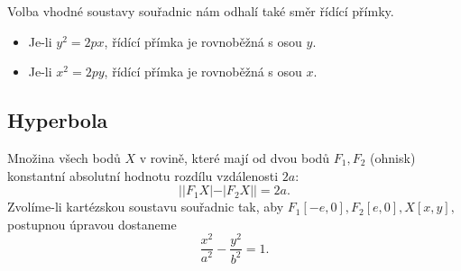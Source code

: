 \begin{pozn} Volba vhodné soustavy souřadnic nám odhalí také směr řídící přímky.
\begin{itemize}
\item Je-li $y^2=2px$, řídící přímka je rovnoběžná s osou $y$.
\item Je-li $x^2=2py$, řídící přímka je rovnoběžná s osou $x$.
\end{itemize}
\end{pozn}

\subsection*{Hyperbola}
Množina všech bodů $X$ v rovině, které mají od dvou bodů $F_1, F_2$
(ohnisk) konstantní absolutní hodnotu rozdílu vzdálenosti $2a$:
$$||F_1X|-|F_2X||=2a.$$
Zvolíme-li kartézskou soustavu souřadnic tak, aby $F_1[-e,0], F_2[e,0],
X[x,y],$ postupnou úpravou dostaneme
$$\frac{x^2}{a^2}-\frac{y^2}{b^2}=1.$$

